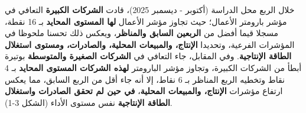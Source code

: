 خلال الربع محل الدراسة (أكتوبر - ديسمبر 2025)، قادت \textbf{الشركات الكبيرة} التعافي في مؤشر بارومتر الأعمال؛ حيث تجاوز مؤشر الأعمال \textbf{لها المستوى المحايد} بـ 16 نقطة، مسجلا قيما أفضل من \textbf{الربعين السابق والمناظر}، ويعكس ذلك تحسنا ملحوظا في المؤشرات الفرعية، وتحديدا \textbf{الإنتاج، والمبيعات المحلية، والصادرات، ومستوى استغلال الطاقة الإنتاجية}. وفي المقابل، جاء التعافي في \textbf{الشركات الصغيرة والمتوسطة} بوتيرة أبطأ من الشركات الكبيرة، وتجاوز مؤشر البارومتر \textbf{لهذه الشركات المستوى المحايد} بـ 4 نقاط وتخطيه الربع المناظر بـ 6 نقاط، إلا أنه جاء أقل من الربع السابق، مما يعكس ارتفاع مؤشرات \textbf{الإنتاج، والمبيعات المحلية}، \textbf{في حين لم تحقق الصادرات واستغلال الطاقة الإنتاجية} نفس مستوى الأداء (الشكل 3-1).
